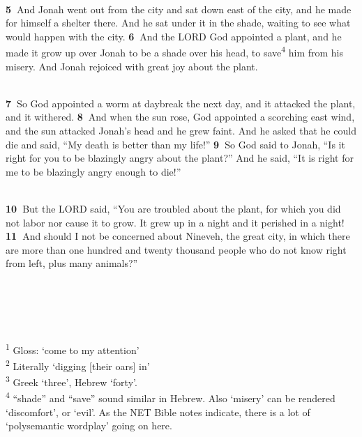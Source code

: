 \documentclass[
]{article}
\begin{document}
\strut \\
\textbf{5~}And Jonah went out from the city and sat down east of the
city, and he made for himself a shelter there. And he sat under it in
the shade, waiting to see what would happen with the city.
\textbf{6~}And the LORD God appointed a plant, and he made it grow up
over Jonah to be a shade over his head, to save\textsuperscript{4} him
from his misery. And Jonah rejoiced with great joy about the plant.\\
\strut \\
\textbf{7~}So God appointed a worm at daybreak the next day, and it
attacked the plant, and it withered. \textbf{8~}And when the sun rose,
God appointed a scorching east wind, and the sun attacked Jonah's head
and he grew faint. And he asked that he could die and said, ``My death
is better than my life!'' \textbf{9~}So God said to Jonah, ``Is it right
for you to be blazingly angry about the plant?'' And he said, ``It is
right for me to be blazingly angry enough to die!''\\
\strut \\
\textbf{10~}But the LORD said, ``You are troubled about the plant, for
which you did not labor nor cause it to grow. It grew up in a night and
it perished in a night! \textbf{11~}And should I not be concerned about
Nineveh, the great city, in which there are more than one hundred and
twenty thousand people who do not know right from left, plus many
animals?''\\
\strut \\
\strut \\
\strut \\
\textsuperscript{1} Gloss: `come to my attention'\\
\textsuperscript{2} Literally `digging {[}their oars{]} in'\\
\textsuperscript{3} Greek `three', Hebrew `forty'.\\
\textsuperscript{4} ``shade'' and ``save'' sound similar in Hebrew. Also
`misery' can be rendered `discomfort', or `evil'. As the NET Bible notes
indicate, there is a lot of `polysemantic wordplay' going on here.
\end{document}
